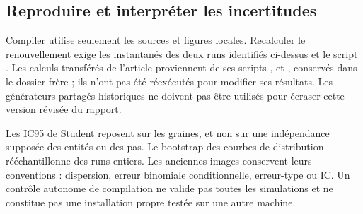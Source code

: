 \subsection{Reproduire et interpréter les incertitudes}
Compiler utilise seulement les sources et figures locales. Recalculer le
renouvellement exige les instantanés des deux runs identifiés ci-dessus et
le script . Les calculs transférés de
l'article proviennent de ses scripts ,
 et , conservés dans le dossier
frère ; ils n'ont pas été réexécutés pour modifier ses résultats.
Les générateurs partagés historiques ne doivent pas être utilisés pour
écraser cette version révisée du rapport.

Les IC95 de Student reposent sur les graines, et non sur une indépendance
supposée des entités ou des pas. Le bootstrap des courbes de distribution
rééchantillonne des runs entiers. Les anciennes images conservent leurs
conventions : dispersion, erreur binomiale conditionnelle, erreur-type ou IC.
Un contrôle autonome de compilation ne valide pas toutes les simulations
et ne constitue pas une installation propre testée sur une autre machine.
